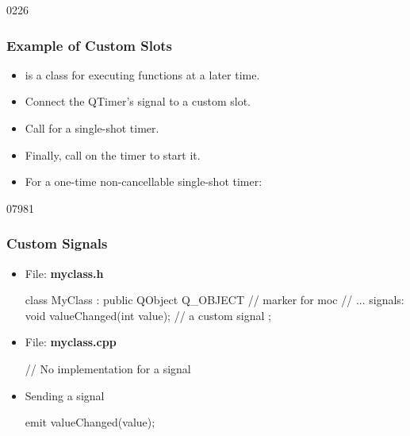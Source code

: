\begin{slide}{0226}\frametitle{Example of Custom Slots}\label{qtimer}

\begin{itemize}
  \item {} is a class for executing functions at a later time.
  \item Connect the QTimer's signal  to a custom slot.
  \item Call  for a single-shot timer.
  \item Finally, call  on the timer to start it.
  \item For a one-time non-cancellable single-shot timer: 
  \end{itemize}


\end{slide}


\begin{slide}[fragile]{07981}\frametitle{Custom Signals}
\label{codeForSignals1}
\begin{itemize}
\item File: \textbf{myclass.h} 
  \begin{cpp}
class MyClass : public QObject 
{
  Q_OBJECT // marker for moc                       
  // ...
signals:
  void valueChanged(int value); // a custom signal
};
  \end{cpp}
\item File: \textbf{myclass.cpp}
  \begin{cpp}
// No implementation for a signal

  \end{cpp}
\item Sending a signal
\begin{cpp}
emit valueChanged(value);
\end{cpp}
\end{itemize}


\end{slide}




